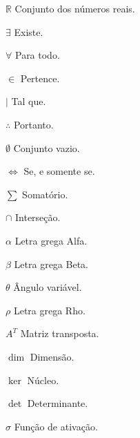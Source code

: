 \documentclass[
12pt,
 a4paper,
    english,
    brazil,
    oneside
    ]{abntex2}
\begin{document}
	\begin{simbolos}
		\item[$ \mathbb{R} $] Conjunto dos números reais.
		\item[$\exists$] Existe.
		\item[$\forall$] Para todo.
		\item[$\in$] Pertence.
		\item[$\mid$] Tal que.
		\item[$\therefore$] Portanto.
		\item[$\emptyset$] Conjunto vazio.
		\item[$\iff$] Se, e somente se.
		\item[$\sum$] Somatório.
		\item[$\cap$] Interseção.
		\item[$\alpha$] Letra grega Alfa.
		\item[$\beta$] Letra grega Beta.
		\item[$\theta$] Ângulo variável.
		\item[$\rho$] Letra grega Rho.
		\item[$A^T$] Matriz transposta.
		\item[$\dim$] Dimensão.
		\item[$\ker$] Núcleo.
		\item[$\det$] Determinante.
		\item[$\sigma$] Função de ativação.
	\end{simbolos}
	
	
	\tableofcontents*
	\cleardoublepage
	
	
	\textual
	
	
		
	
	
	
	
	
	
	
		
	
	

		
\end{document}
